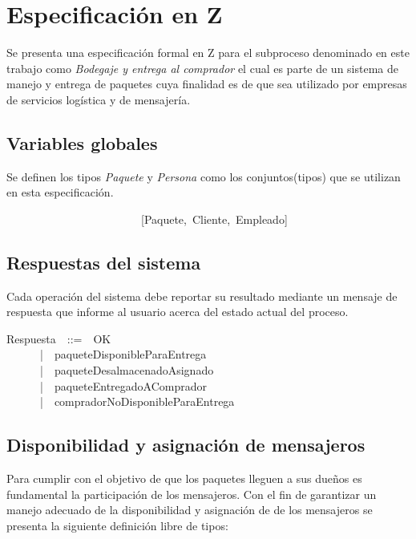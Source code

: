 \documentclass[12pt,a4paper,zed]{article}
\begin{document}
\newpage
\section{Especificación en Z}

Se presenta una especificación formal en Z para el subproceso denominado en este trabajo como \textit{Bodegaje y entrega al comprador} el cual es parte de un sistema de manejo y entrega de paquetes cuya finalidad es de que sea utilizado por empresas de servicios logística y de mensajería.  

\subsection{Variables globales}
Se definen los tipos \textit{Paquete} y \textit{Persona}  como los conjuntos(tipos) que se utilizan en esta especificación. 

\begin{zed}
~~~~~~~~~~~~~~~~~~~~~~~~[Paquete,~Cliente,~Empleado]
\end{zed}

\subsection{Respuestas del sistema}

Cada operación del sistema debe reportar su resultado mediante un mensaje de respuesta que informe al usuario acerca del estado actual del proceso.

\begin{zed}
Respuesta~~::=~~OK\\
~~~~~~|~~paqueteDisponibleParaEntrega\\
~~~~~~|~~paqueteDesalmacenadoAsignado\\
~~~~~~|~~paqueteEntregadoAComprador\\
~~~~~~|~~compradorNoDisponibleParaEntrega\\
\end{zed}

\subsection{Disponibilidad y asignación de mensajeros}
\indent Para cumplir con el objetivo de que los paquetes lleguen a sus dueños es fundamental la participación de los mensajeros. Con el fin de garantizar un manejo adecuado de la disponibilidad y asignación de de los mensajeros se presenta la siguiente definición libre de tipos:
\end{document}
